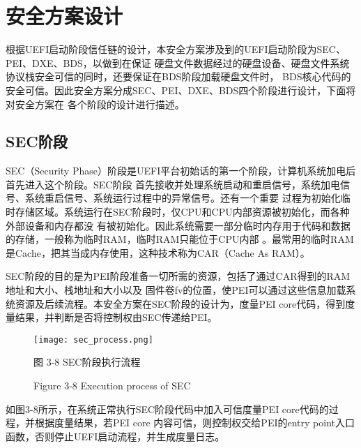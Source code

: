 %
%
\section{安全方案设计}
根据UEFI启动阶段信任链的设计，本安全方案涉及到的UEFI启动阶段为SEC、PEI、DXE、BDS，以做到在保证
硬盘文件数据经过的硬盘设备、硬盘文件系统协议栈安全可信的同时，还要保证在BDS阶段加载硬盘文件时，
BDS核心代码的安全可信。因此安全方案分成SEC、PEI、DXE、BDS四个阶段进行设计，下面将对安全方案在
各个阶段的设计进行描述。

\subsection{SEC阶段}
SEC（Security Phase）阶段是UEFI平台初始话的第一个阶段，计算机系统加电后首先进入这个阶段。SEC阶段
首先接收并处理系统启动和重启信号，系统加电信号、系统重启信号、系统运行过程中的异常信号。还有一个重要
过程为初始化临时存储区域。系统运行在SEC阶段时，仅CPU和CPU内部资源被初始化，而各种外部设备和内存都没
有被初始化。因此系统需要一部分临时内存用于代码和数据的存储，一般称为临时RAM，临时RAM只能位于CPU内部
。最常用的临时RAM是Cache，把其当成内存使用，这种技术称为CAR（Cache As RAM）。
\par SEC阶段的目的是为PEI阶段准备一切所需的资源，包括了通过CAR得到的RAM地址和大小、栈地址和大小以及
固件卷fv的位置，使PEI可以通过这些信息加载系统资源及后续流程。本安全方案在SEC阶段的设计为，度量PEI 
core代码，得到度量结果，并判断是否将控制权由SEC传递给PEI。

\begin{figure}[htb]
    \label{ffs_format}
    \vspace{0cm}   
    \setlength{\abovecaptionskip}{0.3cm}
	\centering
    \texttt{[image: sec\_process.png]}
    \caption*{图 3-8 SEC阶段执行流程}
    \setlength{\belowcaptionskip}{-0.7cm}
    \caption*{Figure 3-8 Execution process of SEC}
\end{figure}

如图3-8所示，在系统正常执行SEC阶段代码中加入可信度量PEI core代码的过程，并根据度量结果，若PEI core
内容可信，则控制权交给PEI的entry point入口函数，否则停止UEFI启动流程，并生成度量日志。

